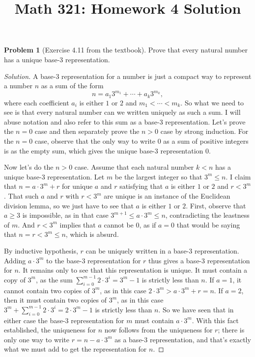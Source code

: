 \documentclass[10pt]{amsart}
\title{Math 321: Homework 4 Solution}
\theoremstyle{definition}
\newtheorem{problem}{Problem}
\begin{document}
\maketitle

\setcounter{problem}{4}
\begin{problem}[Exercise 4.11 from the textbook]
Prove that every natural number has a unique base-$3$ representation.
\end{problem}

\begin{proof}[Solution]
A base-$3$ representation for a number is just a compact way to represent a number $n$ as a sum of the form
\[
n = a_1 3^{m_1} + \cdots + a_k 3^{m_k},
\]
where each coefficient $a_i$ is either $1$ or $2$ and $m_1 < \cdots < m_k$. So what we need to see is that every natural number can we written uniquely as such a sum. I will abuse notation and also refer to this sum as a base-$3$ representation.
Let's prove the $n=0$ case and then separately prove the $n>0$ case by strong induction. For the $n=0$ case, observe that the only way to write $0$ as a sum of positive integers is as the empty sum, which gives the unique base-$3$ representation $0$.

Now let's do the $n>0$ case. Assume that each natural number $k < n$ has a unique base-$3$ representation. Let $m$ be the largest integer so that $3^m \le n$. I claim that $n = a\cdot 3^m + r$ for unique $a$ and $r$ satisfying that $a$ is either $1$ or $2$ and $r < 3^m$. That such $a$ and $r$ with $r < 3^m$ are unique is an instance of the Euclidean division lemma, so we just have to see that $a$ is either $1$ or $2$. First, observe that $a \ge 3$ is impossible, as in that case $3^{m+1} \le a \cdot 3^m \le n$, contradicting the leastness of $m$. And $r < 3^m$ implies that $a$ cannot be $0$, as if $a=0$ that would be saying that $n = r < 3^m \le n$, which is absurd. 

By inductive hypothesis, $r$ can be uniquely written in a base-$3$ representation. Adding $a \cdot 3^m$ to the base-$3$ representation for $r$ thus gives a base-$3$ representation for $n$. It remains only to see that this representation is unique. It must contain a copy of $3^m$, as the sum $\sum_{i=0}^{m-1}2 \cdot 3^i = 3^m - 1$ is strictly less than $n$. If $a=1$, it cannot contain two copies of $3^m$, as in this case $2\cdot 3^m > a\cdot 3^m + r = n$. If $a=2$, then it must contain two copies of $3^m$, as in this case $3^m + \sum_{i=0}^{m-1}2 \cdot 3^i = 2\cdot 3^m - 1$ is strictly less than $n$. So we have seen that in either case the base-$3$ representation for $m$ must contain $a\cdot 3^m$. With this fact established, the uniqueness for $n$ now follows from the uniqueness for $r$; there is only one way to write $r = n - a\cdot 3^m$ as a base-$3$ representation, and that's exactly what we must add to get the representation for $n$.
\end{proof}
\end{document}
